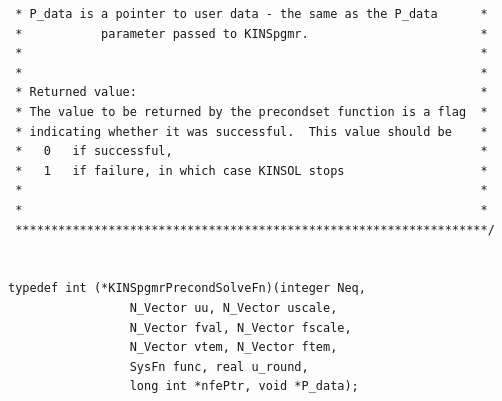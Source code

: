 \documentclass[11pt]{article}
\begin{document}
\begin{verbatim}
 * P_data is a pointer to user data - the same as the P_data      *
 *           parameter passed to KINSpgmr.                        *
 *                                                                *
 *                                                                *
 * Returned value:                                                *
 * The value to be returned by the precondset function is a flag  *
 * indicating whether it was successful.  This value should be    *
 *   0   if successful,                                           *
 *   1   if failure, in which case KINSOL stops                   *
 *                                                                *
 *                                                                *
 ******************************************************************/


typedef int (*KINSpgmrPrecondSolveFn)(integer Neq,
                 N_Vector uu, N_Vector uscale,
                 N_Vector fval, N_Vector fscale,
                 N_Vector vtem, N_Vector ftem,
                 SysFn func, real u_round,
                 long int *nfePtr, void *P_data);


\end{verbatim}
\end{document}
